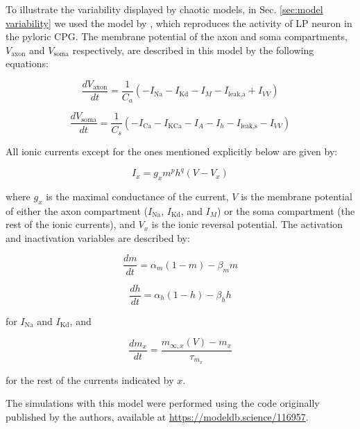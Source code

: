 To illustrate the variability displayed by chaotic models, in Sec. \ref{sec:model variability} we used the model by \textcite{nowotny_probing_2008}, which reproduces the activity of LP neuron in the pyloric CPG. The membrane potential of the axon and soma compartments, $V_{\text{axon}}$ and $V_{\text{soma}}$ respectively, are described in this model by the following equations:

\begin{equation}
	\frac{dV_{\text{axon}}}{dt} = \frac{1}{C_a} \left( -I_{\text{Na}} - I_{\text{Kd}} - I_M - I_{\text{leak,a}} + I_{VV} \right)
\end{equation}

\begin{equation}
	\frac{dV_{\text{soma}}}{dt} = \frac{1}{C_s} \left( -I_{\text{Ca}} - I_{\text{KCa}} - I_A - I_h - I_{\text{leak,s}} - I_{VV} \right)
\end{equation}

All ionic currents except for the ones mentioned explicitly below are given by:

\begin{equation}
	I_x = g_x m^p h^q (V - V_x)
\end{equation}

where $g_x$ is the maximal conductance of the current, $V$ is the membrane potential of either the axon compartment ($I_{\text{Na}}$, $I_{\text{Kd}}$, and $I_M$) or the soma compartment (the rest of the ionic currents), and $V_x$ is the ionic reversal potential. The activation and inactivation variables are described by:

\begin{equation}
	\frac{dm}{dt} = \alpha_m (1 - m) - \beta_m m
\end{equation}

\begin{equation}
	\frac{dh}{dt} = \alpha_h (1 - h) - \beta_h h
\end{equation}

for $I_{\text{Na}}$ and $I_{\text{Kd}}$, and

\begin{equation}
	\frac{dm_x}{dt} = \frac{m_{\infty,x}(V) - m_x}{\tau_{m_x}}
\end{equation}

for the rest of the currents indicated by $x$.

The simulations with this model were performed using the code originally published by the authors, available at \href{https://modeldb.science/116957}{https://modeldb.science/116957}.

